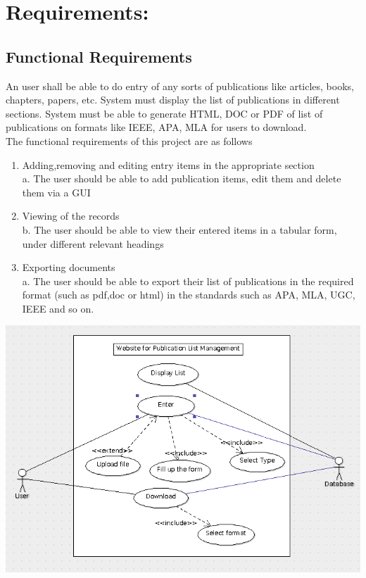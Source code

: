 \documentclass[12pt]{extarticle}
\begin{document}
	\section{Requirements:}
	\subsection{Functional Requirements}
	An user shall be able to do entry of any sorts of publications like articles, books,
	chapters, papers, etc. System must display the list of publications in different sections. System
	must be able to generate HTML, DOC or PDF of list of publications on formats like IEEE,
	APA, MLA for users to download.\\ \newline
	The functional requirements of this project are as follows
	
	\begin{enumerate}
	\item Adding,removing and editing entry items in the appropriate section
	\\a. The user should be able to add publication items, edit them and delete them via a GUI
	\item Viewing of the records
	\\b. The user should be able to view their entered items in a tabular form, under different
	relevant headings
	\item Exporting documents
	\\a. The user should be able to export their list of publications in the required format (such
	as pdf,doc or html) in the standards such as APA, MLA, UGC, IEEE and so on.
\end{enumerate}
		\vspace{5mm}
		\includegraphics[scale=0.6]{funcreq}
\end{document}

